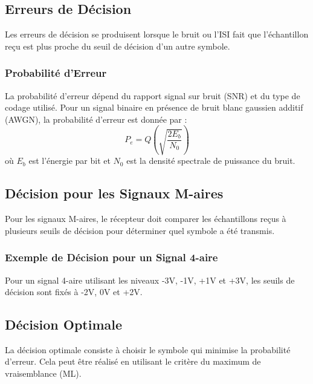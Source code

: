 \documentclass[10pt,a4paper]{article}
\begin{document}

\subsection*{Erreurs de Décision}
Les erreurs de décision se produisent lorsque le bruit ou l'ISI fait que l'échantillon reçu est plus proche du seuil de décision d'un autre symbole.

\subsubsection*{Probabilité d'Erreur}
La probabilité d'erreur dépend du rapport signal sur bruit (SNR) et du type de codage utilisé. Pour un signal binaire en présence de bruit blanc gaussien additif (AWGN), la probabilité d'erreur est donnée par :
\[ P_e = Q\left(\sqrt{\frac{2E_b}{N_0}}\right) \]
où \( E_b \) est l'énergie par bit et \( N_0 \) est la densité spectrale de puissance du bruit.

\subsection*{Décision pour les Signaux M-aires}
Pour les signaux M-aires, le récepteur doit comparer les échantillons reçus à plusieurs seuils de décision pour déterminer quel symbole a été transmis.

\subsubsection*{Exemple de Décision pour un Signal 4-aire}
Pour un signal 4-aire utilisant les niveaux -3V, -1V, +1V et +3V, les seuils de décision sont fixés à -2V, 0V et +2V.

\subsection*{Décision Optimale}
La décision optimale consiste à choisir le symbole qui minimise la probabilité d'erreur. Cela peut être réalisé en utilisant le critère du maximum de vraisemblance (ML).
\end{document}
